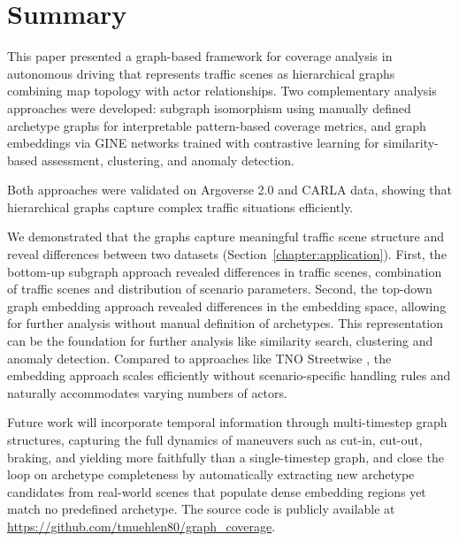 \section{Summary}

This paper presented a graph-based framework for coverage analysis in autonomous driving that represents traffic scenes as hierarchical graphs combining map topology with actor relationships.
Two complementary analysis approaches were developed: subgraph isomorphism using manually defined archetype graphs for interpretable pattern-based coverage metrics, 
and graph embeddings via GINE networks trained with contrastive learning for similarity-based assessment, clustering, and anomaly detection.

Both approaches were validated on Argoverse 2.0 and CARLA data, showing that hierarchical graphs capture complex traffic situations efficiently.

We demonstrated that the graphs capture meaningful traffic scene structure and reveal differences between two datasets (Section~\ref{chapter:application}). First, the bottom-up subgraph approach revealed differences in traffic scenes, combination of
traffic scenes and distribution of scenario parameters. Second, the top-down graph embedding approach revealed differences in the embedding space, allowing for further analysis without manual definition of archetypes. This representation 
can be the foundation for further analysis like similarity search, clustering and anomaly detection. Compared to approaches like TNO Streetwise \cite{tno_streetwise}, the embedding approach scales efficiently without scenario-specific handling rules and naturally accommodates varying numbers of actors.

Future work will incorporate temporal information through multi-timestep graph structures, capturing the full dynamics of maneuvers such as cut-in, cut-out, braking, and yielding more faithfully than a single-timestep graph, and close the loop on archetype completeness by automatically extracting new archetype candidates from real-world scenes that populate dense embedding regions yet match no predefined archetype. The source code is publicly available at \url{https://github.com/tmuehlen80/graph_coverage}.

